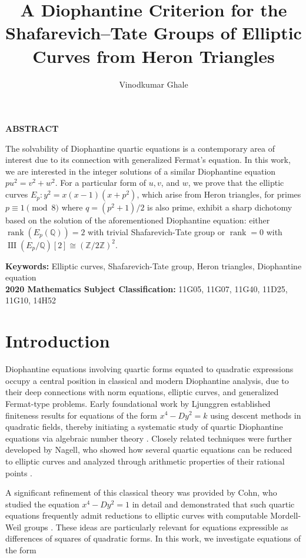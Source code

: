 \documentclass[10pt]{article}
\title{A Diophantine Criterion for the Shafarevich--Tate Groups of Elliptic Curves from Heron Triangles}
\author{Vinodkumar Ghale}
\date{}
\DeclareMathOperator{\III}{III}
\renewenvironment{abstract}
 {\small
  \begin{center}
    \bfseries ABSTRACT
  \end{center}
  \quotation}
 {\endquotation}
\begin{document}
\maketitle

\begin{abstract}
The solvability of Diophantine quartic equations is a contemporary area of interest due to its connection with generalized Fermat's equation. In this work, we are interested in the integer solutions of a similar Diophantine equation \(pu^2 = v^2 + w^2\). For a particular form of \(u, v\), and \(w\), we prove that the elliptic curves \(E_p: y^2 = x(x - 1)(x + p^2)\), which arise from Heron triangles, for primes \(p \equiv 1 \pmod{8}\) where \(q = (p^2 + 1)/2\) is also prime, exhibit a sharp dichotomy based on the solution of the aforementioned Diophantine equation: either \(\operatorname{rank}(E_p(\mathbb{Q})) = 2\) with trivial Shafarevich-Tate group or \(\operatorname{rank} = 0\) with \(\III(E_p/\mathbb{Q})[2] \cong (\mathbb{Z}/2\mathbb{Z})^2\).
\end{abstract}

\noindent\textbf{Keywords:} Elliptic curves, Shafarevich-Tate group, Heron triangles, Diophantine equation\\
\textbf{2020 Mathematics Subject Classification:} 11G05, 11G07, 11G40, 11D25, 11G10, 14H52

\section{Introduction}

Diophantine equations involving quartic forms equated to quadratic expressions occupy a central position in classical and modern Diophantine analysis, due to their deep connections with norm equations, elliptic curves, and generalized Fermat-type problems. Early foundational work by Ljunggren established finiteness results for equations of the form \(x^4 - Dy^2 = k\) using descent methods in quadratic fields, thereby initiating a systematic study of quartic Diophantine equations via algebraic number theory \cite{17}. Closely related techniques were further developed by Nagell, who showed how several quartic equations can be reduced to elliptic curves and analyzed through arithmetic properties of their rational points \cite{19}.

A significant refinement of this classical theory was provided by Cohn, who studied the equation \(x^4 - Dy^2 = 1\) in detail and demonstrated that such quartic equations frequently admit reductions to elliptic curves with computable Mordell-Weil groups \cite{10}. These ideas are particularly relevant for equations expressible as differences of squares of quadratic forms. In this work, we investigate equations of the form
\end{document}

